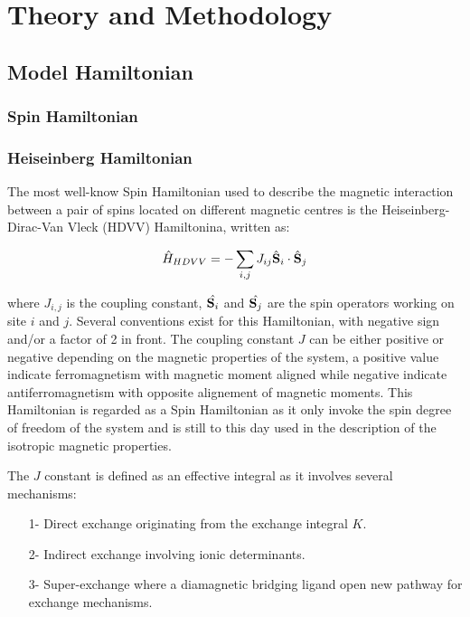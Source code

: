 \documentclass[12pt]{report}
\numberwithin{equation}{section}
\begin{document}
\chapter{Theory and Methodology}

\section{Model Hamiltonian}

\subsection{Spin Hamiltonian}

\subsection*{Heiseinberg Hamiltonian}
The most well-know Spin Hamiltonian used to describe the magnetic interaction between a pair of spins located on different magnetic centres is the Heiseinberg-Dirac-Van Vleck (HDVV) Hamiltonina, written as:

\begin{equation}\label{Hheis}
    \hat{H}_{HDVV}=-\sum_{i,j} J_{ij} \hat{\vb S}_i \cdot \hat{\vb S}_j
\end{equation}

where $J_{i,j}$ is the coupling constant, $\hat{\vb S_i}$ and $\hat{\vb S_j}$ are the spin operators working on site $i$ and $j$.
Several conventions exist for this Hamiltonian, with negative sign and/or a factor of 2 in front.  
The coupling constant $J$ can be either positive or negative depending on the magnetic properties of the system, a positive value indicate ferromagnetism with magnetic moment aligned while negative indicate antiferromagnetism with opposite alignement of magnetic moments.
This Hamiltonian is regarded as a Spin Hamiltonian as it only invoke the spin degree of freedom of the system and is still to this day used in the description of the isotropic magnetic properties.

The $J$ constant is defined as an effective integral as it involves several mechanisms:
\begin{itemize}
    \item[1-] Direct exchange originating from the exchange integral $K$.
    \item[2-] Indirect exchange involving ionic determinants.
    \item[3-] Super-exchange where a diamagnetic bridging ligand open new pathway for exchange mechanisms.
\end{itemize}
\end{document}
